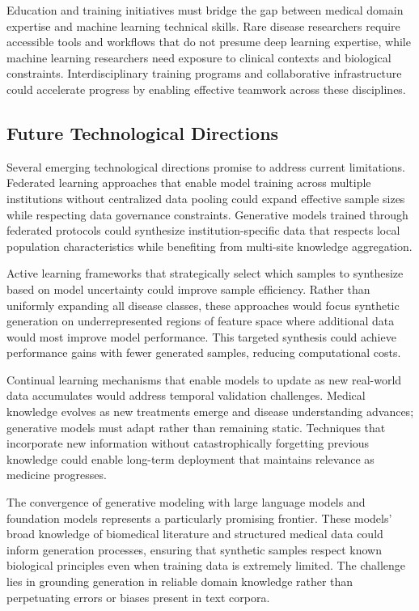 Education and training initiatives must bridge the gap between medical domain expertise and machine learning technical skills. Rare disease researchers require accessible tools and workflows that do not presume deep learning expertise, while machine learning researchers need exposure to clinical contexts and biological constraints. Interdisciplinary training programs and collaborative infrastructure could accelerate progress by enabling effective teamwork across these disciplines.

\subsection{Future Technological Directions}

Several emerging technological directions promise to address current limitations. Federated learning approaches that enable model training across multiple institutions without centralized data pooling could expand effective sample sizes while respecting data governance constraints. Generative models trained through federated protocols could synthesize institution-specific data that respects local population characteristics while benefiting from multi-site knowledge aggregation.

Active learning frameworks that strategically select which samples to synthesize based on model uncertainty could improve sample efficiency. Rather than uniformly expanding all disease classes, these approaches would focus synthetic generation on underrepresented regions of feature space where additional data would most improve model performance. This targeted synthesis could achieve performance gains with fewer generated samples, reducing computational costs.

Continual learning mechanisms that enable models to update as new real-world data accumulates would address temporal validation challenges. Medical knowledge evolves as new treatments emerge and disease understanding advances; generative models must adapt rather than remaining static. Techniques that incorporate new information without catastrophically forgetting previous knowledge could enable long-term deployment that maintains relevance as medicine progresses.

The convergence of generative modeling with large language models and foundation models represents a particularly promising frontier. These models' broad knowledge of biomedical literature and structured medical data could inform generation processes, ensuring that synthetic samples respect known biological principles even when training data is extremely limited. The challenge lies in grounding generation in reliable domain knowledge rather than perpetuating errors or biases present in text corpora.

